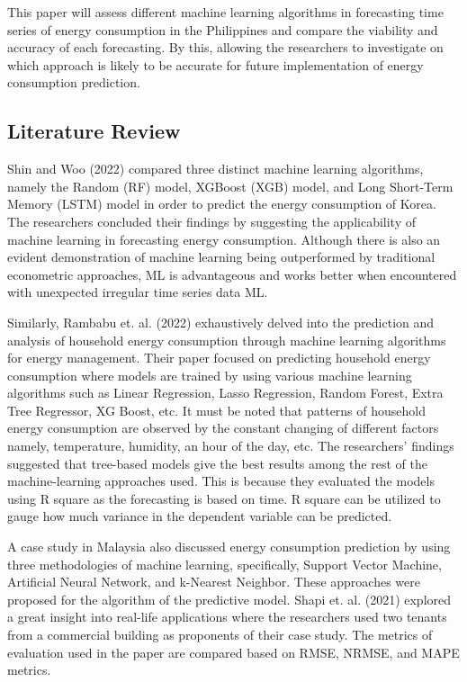 \documentclass[runningheads]{llncs}
\begin{document}
This paper will assess different machine learning algorithms in forecasting time series of energy consumption in the Philippines and compare the viability and accuracy of each forecasting. By this, allowing the researchers to investigate on which approach is likely to be accurate for future implementation of energy consumption prediction.

\subsection{Literature Review}
Shin and Woo (2022) compared three distinct machine learning algorithms, namely the Random (RF) model, XGBoost (XGB) model, and Long Short-Term Memory (LSTM) model in order to predict the energy consumption of Korea. The researchers concluded their findings by suggesting the applicability of machine learning in forecasting energy consumption. Although there is also an evident demonstration of machine learning being outperformed by traditional econometric approaches,  ML is advantageous and works better when encountered with unexpected irregular time series data ML. 

Similarly, Rambabu et. al. (2022) exhaustively delved into the prediction and analysis of household energy consumption through machine learning algorithms for energy management. Their paper focused on predicting household energy consumption where models are trained by using various machine learning algorithms such as Linear Regression, Lasso Regression, Random Forest, Extra Tree Regressor, XG Boost, etc. It must be noted that patterns of household energy consumption are observed by the constant changing of different factors namely, temperature, humidity, an hour of the day, etc. The researchers’ findings suggested that tree-based models give the best results among the rest of the machine-learning approaches used. This is because they evaluated the models using R square as the forecasting is based on time. R square can be utilized to gauge how much variance in the dependent variable can be predicted. 

A case study in Malaysia also discussed energy consumption prediction by using three methodologies of machine learning, specifically, Support Vector Machine, Artificial Neural Network, and k-Nearest Neighbor. These approaches were proposed for the algorithm of the predictive model. Shapi et. al. (2021) explored a great insight into real-life applications where the researchers used two tenants from a commercial building as proponents of their case study. The metrics of evaluation used in the paper are compared based on RMSE, NRMSE, and MAPE metrics.
\end{document}
